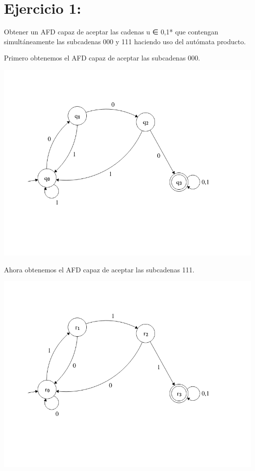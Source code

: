 \documentclass[12pt, spanish]{article}
\begin{document}



\section{Ejercicio 1:} Obtener un AFD capaz de aceptar las cadenas u ∈ {0,1}* que contengan simultáneamente las subcadenas 000 y 111 haciendo uso del autómata producto.

Primero obtenemos el AFD capaz de aceptar las subcadenas 000.

\begin{center}
	\includegraphics[scale=0.45]{aut1.png}
\end{center}

Ahora obtenemos el AFD capaz de aceptar las subcadenas 111.

\begin{center}
	\includegraphics[scale=0.45]{aut2.png}
\end{center}
\end{document}
